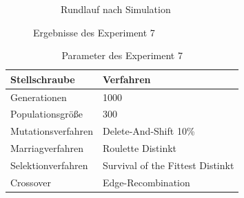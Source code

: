 \begin{figure}
\begin{subfigure}[Simulation]{0.49\textwidth}
		\caption{Rundlauf nach Simulation}
		\label{fig:experiment72}
	\end{subfigure}
\caption{Ergebnisse des Experiment 7}
\label{fig:experiment7}
\end{figure}

\begin{table}[H]
\centering
\caption{Parameter des Experiment 7}
\begin{tabular}{ll}
Stellschraube & Verfahren \\
\hline
Generationen & 1000 \\
Populationsgröße & 300 \\
Mutationsverfahren & Delete-And-Shift 10\% \\
Marriagverfahren & Roulette Distinkt \\
Selektionverfahren & Survival of the Fittest Distinkt \\
Crossover & Edge-Recombination
\end{tabular}
\label{tab:e7}
\end{table}

